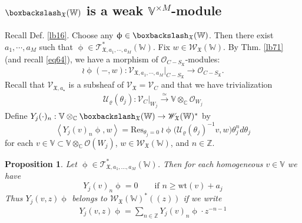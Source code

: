 \documentclass[11pt,b5paper,notitlepage]{article}
\theoremstyle{definition}
\theoremstyle{plain}
\newtheorem{pp}[df]{Proposition}
\newcommand{\fk}{\mathfrak}
\newcommand{\mc}{\mathcal}
\newcommand{\Res}{\mathrm{Res}}
\newcommand{\SV}{\mathscr{V}}
\newcommand{\scr}{\mathscr}
\newcommand{\Vbb}{\mathbb V}
\newcommand{\Wbb}{\mathbb W}
\newcommand{\Cbb}{\mathbb C}
\newcommand{\Zbb}{\mathbb Z}
\newcommand{\wt}{\mathrm{wt}}
\newcommand{\<}{\left\langle}
\renewcommand{\>}{\right\rangle}
\newcommand{\MO}{\mathcal{O}}
\newcommand{\fx}{\mathfrak{X}}
\newcommand{\ST}{\mathscr{T}}
\newcommand{\bbs}{\boxbackslash}
\numberwithin{equation}{section}
\begin{document}
 

\subsection{$\bbs_{\fk X}(\Wbb)$ is a weak $\Vbb^{\times M}$-module}
Recall Def. \ref{lb16}. Choose any $\upphi\in\boxbackslash_{\fx}(\Wbb)$. Then there exist $a_1,\cdots, a_M$ such that $\upphi\in \ST_{\fx,a_1,\cdots ,a_M}^*(\Wbb)$. Fix $w\in \scr W_{\fk X}(\Wbb)$. By Thm. \ref{lb71} (and recall \eqref{eq64}), we have a morphism of $\MO_{C-S_\fx}$-modules:
\begin{equation}\label{action1}
\wr\upphi(-,w):\SV_{\fx,a_1,\cdots,a_M}\vert_{C-S_\fx}\rightarrow \MO_{C-S_\fx}.
\end{equation}
Recall that $\scr V_{\fk X,a_\star}$ is a subsheaf of $\scr V_{\fk X}=\scr V_C$ and that we have trivialization
\begin{gather}
\mc U_\varrho(\theta_j):\scr V_C|_{W_j}\xrightarrow{\simeq}\Vbb\otimes_\Cbb\mc O_{W_j}  \label{eq68}
\end{gather}
Define $Y_j(\cdot)_n:\Vbb\otimes_\Cbb\boxbackslash_{\fx}(\Wbb)\rightarrow \scr W_\fx(\Wbb)^*$  by 
    \begin{equation}\label{eq72}
\boxed{  ~  \<Y_j(v)_n\upphi,w\>=\Res_{\theta_j=0}~{\wr\upphi}\big(\mc U_\varrho(\theta_j)^{-1}v,w\big)\theta_j^n d\theta_j~}
    \end{equation}
    for each $v\in \Vbb\subset\Vbb\otimes_\Cbb\mc O(W_j)$, $w\in\scr W_{\fk X}(\Wbb)$, and $n\in \Zbb$. 








   
\begin{pp}\label{lb20}
Let $\upphi\in\scr T_{\fk X,a_1,\dots,a_M}^*(\Wbb)$. Then for each homogeneous $v\in\Vbb$ we have
\begin{equation}\label{eq126}
Y_j(v)_n \upphi=0 \qquad \text{if } n\geq \wt(v)+a_j
\end{equation}
Thus $Y_j(v,z)\upphi$ belongs to $\scr W_{\fk X}(\Wbb)^*((z))$  if we write
\begin{align*}
Y_j(v,z)\upphi=\sum_{n\in\Zbb}Y_j(v)_n\upphi\cdot z^{-n-1}
\end{align*}
\end{pp}
  
\end{document}
